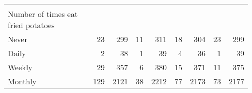 \documentclass{article}
\begin{document}
\begin{tabular}{lllllllll}
  \multicolumn{1}{r}{} \\
\multicolumn{1}{l}{\hspace{4em}Number of times eat fried potatoes} &
  \multicolumn{1}{|r}{} &
  \multicolumn{1}{r}{} &
  \multicolumn{1}{r}{} &
  \multicolumn{1}{r}{} &
  \multicolumn{1}{r}{} &
  \multicolumn{1}{r}{} &
  \multicolumn{1}{r}{} &
  \multicolumn{1}{r}{} \\
\multicolumn{1}{l}{\hspace{5em}Never} &
  \multicolumn{1}{|r}{23} &
  \multicolumn{1}{r}{299} &
  \multicolumn{1}{r}{11} &
  \multicolumn{1}{r}{311} &
  \multicolumn{1}{r}{18} &
  \multicolumn{1}{r}{304} &
  \multicolumn{1}{r}{23} &
  \multicolumn{1}{r}{299} \\
\multicolumn{1}{l}{\hspace{5em}Daily} &
  \multicolumn{1}{|r}{2} &
  \multicolumn{1}{r}{38} &
  \multicolumn{1}{r}{1} &
  \multicolumn{1}{r}{39} &
  \multicolumn{1}{r}{4} &
  \multicolumn{1}{r}{36} &
  \multicolumn{1}{r}{1} &
  \multicolumn{1}{r}{39} \\
\multicolumn{1}{l}{\hspace{5em}Weekly} &
  \multicolumn{1}{|r}{29} &
  \multicolumn{1}{r}{357} &
  \multicolumn{1}{r}{6} &
  \multicolumn{1}{r}{380} &
  \multicolumn{1}{r}{15} &
  \multicolumn{1}{r}{371} &
  \multicolumn{1}{r}{11} &
  \multicolumn{1}{r}{375} \\
\multicolumn{1}{l}{\hspace{5em}Monthly} &
  \multicolumn{1}{|r}{129} &
  \multicolumn{1}{r}{2121} &
  \multicolumn{1}{r}{38} &
  \multicolumn{1}{r}{2212} &
  \multicolumn{1}{r}{77} &
  \multicolumn{1}{r}{2173} &
  \multicolumn{1}{r}{73} &
  \multicolumn{1}{r}{2177} \\
\cline{1-9}
\end{tabular}
\end{document}
